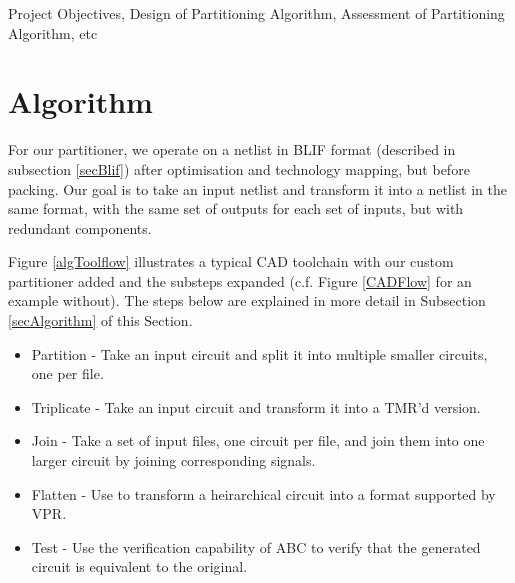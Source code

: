 \documentclass[12pt,final,oneside]{dwThesis} %
\begin{document}
   Project Objectives, Design of Partitioning Algorithm, Assessment of
   Partitioning Algorithm, etc



   \chapter{Algorithm}\label{algorithm}
   For our partitioner, we operate on a netlist in
   \gls{BLIF} format (described in subsection \ref{secBlif}) after optimisation
   and technology mapping, but before packing. Our goal is to take an input
   netlist and transform it into a netlist in the same format, with the same
   set of outputs for each set of inputs, but with redundant components.


   Figure \ref{algToolflow} illustrates a typical \gls{CAD} toolchain with our
   custom partitioner added and the substeps expanded (c.f. Figure
   \ref{CADFlow} for an example without). The steps below are explained in more
   detail in Subsection \ref{secAlgorithm} of this Section.  
   \begin{itemize}

      \item Partition - Take an input circuit and split it into multiple
         smaller circuits, one per file.
      \item Triplicate - Take an input circuit and transform it into a TMR'd
         version.
      \item Join - Take a set of input files, one circuit per file, and join
         them into one larger circuit by joining corresponding signals.
      \item Flatten - Use  to transform a heirarchical circuit into a
         format supported by VPR.
      \item Test - Use the verification capability of \gls{ABC} to verify that
         the generated circuit is equivalent to the original.  
   \end{itemize}
\end{document}
